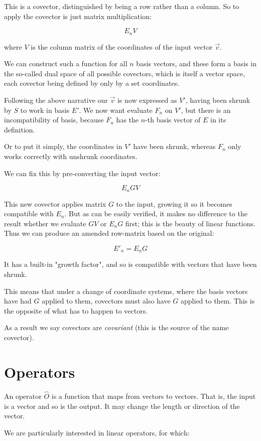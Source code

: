This is a covector, distinguished by being a row rather than a column. So to apply the covector is just matrix multiplication:

$$E_nV$$

where $V$ is the column matrix of the coordinates of the input vector $\vec{v}$.

We can construct such a function for all $n$ basis vectors, and these form a basis in the so-called dual space of all possible covectors, which is itself a vector space, each covector being defined by only by a set coordinates.

Following the above narrative our $\vec{v}$ is now expressed as $V'$, having been shrunk by $S$ to work in basis $E'$. We now want evaluate $F_n$ on $V'$, but there is an incompatibility of basis, because $F_n$ has the $n$-th basis vector of $E$ in its definition.

Or to put it simply, the coordinates in $V'$ have been shrunk, whereas $F_n$ only works correctly with unshrunk coordinates.

We can fix this by pre-converting the input vector:

$$E_nGV$$

This new covector applies matrix $G$ to the input, growing it so it becomes compatible with $E_n$. But as can be easily verified, it makes no difference to the result whether we evaluate $GV$ or $E_nG$ first; this is the beauty of linear functions. Thus we can produce an amended row-matrix based on the original:

$$E'_n = E_nG$$

It has a built-in "growth factor", and so is compatible with vectors that have been shrunk.

This means that under a change of coordinate systems, where the basis vectors have had $G$ applied to them, covectors must also have $G$ applied to them. This is the opposite of what has to happen to vectors.

As a result we say covectors are \textit{covariant} (this is the source of the name covector).

\section{Operators}

An operator $\hat{O}$ is a function that maps from vectors to vectors. That is, the input is a vector and so is the output. It may change the length or direction of the vector.

We are particularly interested in linear operators, for which:

